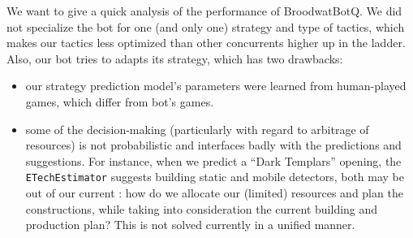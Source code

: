 We want to give a quick analysis of the performance of BroodwatBotQ. We did not specialize the bot for one (and only one) strategy and type of tactics, which makes our tactics less optimized than other concurrents higher up in the ladder. Also, our bot tries to adapts its strategy, which has two drawbacks:
\begin{itemize}
    \item our strategy prediction model's parameters were learned from human-played games, which differ from bot's games.
    \item some of the decision-making (particularly with regard to arbitrage of resources) is not probabilistic and interfaces badly with the predictions and suggestions. For instance, when we predict a ``Dark Templars'' opening, the \texttt{ETechEstimator} suggests building static and mobile detectors, both may be out of our current : how do we allocate our (limited) resources and plan the constructions, while taking into consideration the current building and production plan? This is not solved currently in a unified manner.
\end{itemize}

